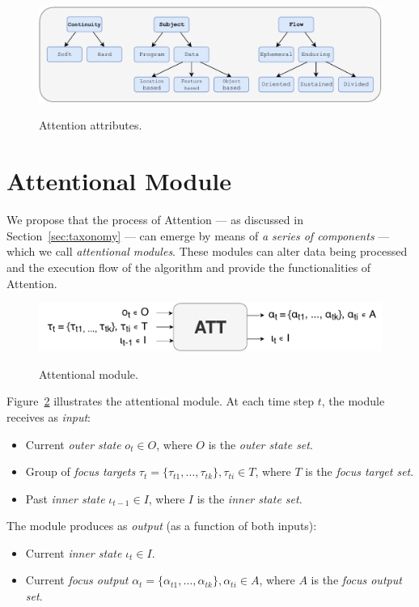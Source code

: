 \documentclass[11pt]{article}
\begin{document}
\begin{figure}[H]
    \centering
    \includegraphics[width=1.0\linewidth]{./img/taxonomy.pdf}\label{fig:taxonomy}
    \caption{Attention attributes.}
\end{figure}

\section{Attentional Module}
We propose that the process of Attention --- as discussed in Section~\ref{sec:taxonomy}  --- can emerge by means of \emph{a series of components} --- which we call \emph{attentional modules}. These modules can alter data being processed and the execution flow of the algorithm and provide the functionalities of Attention.

\begin{figure}[H]
    \centering
    \includegraphics[width=0.9\linewidth]{./img/alt_att_block.pdf}\label{fig:attmodule}
    \caption{Attentional module.}
\end{figure}

Figure~\ref{fig:attmodule} illustrates the attentional module. At each time step $t$, the module receives as \emph{input}:
\begin{itemize}
    \item Current \emph{outer state} $o_t \in O$, where $O$ is the \emph{outer state set}.
    \item Group of \emph{focus targets} $\tau_t = \{\tau_{t1}, \ldots, \tau_{tk}\}, \tau_{ti} \in T$,
        where $T$ is the \emph{focus target set}.
    \item Past \emph{inner state} $\iota_{t-1} \in I$, where $I$ is the \emph{inner state set}.
\end{itemize}

The module produces as \emph{output} (as a function of both inputs):
\begin{itemize}
    \item Current \emph{inner state} $\iota_t \in I$.
    \item Current \emph{focus output} $\alpha_t = \{\alpha_{t1}, \ldots, \alpha_{tk}\}, \alpha_{ti} \in A$,
        where $A$ is the \emph{focus output set}.
\end{itemize}
\end{document}
